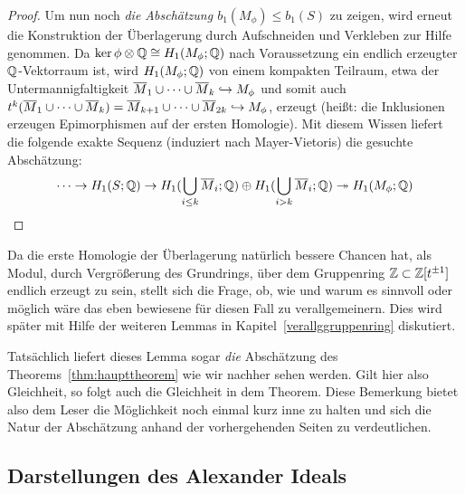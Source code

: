 \begin{proof}
	  Um nun noch\emph{ die Abschätzung $b_1(M_\phi) \leq b_1(S)$ }zu zeigen, wird erneut die Konstruktion der Überlagerung durch Aufschneiden und Verkleben zur Hilfe genommen. Da $\ker\phi \otimes \mathbb{Q} \cong H_1(M_\phi;\mathbb{Q})$ nach Voraussetzung ein endlich erzeugter $\mathbb{Q}$-Vektorraum ist, wird $H_1(M_\phi;\mathbb{Q})$ von einem kompakten Teilraum, etwa der Untermannigfaltigkeit $\overline M_1 \cup \cdots \cup \overline M_k \hookrightarrow M_\phi$ und somit auch $t^k(\overline M_1 \cup \cdots \cup \overline M_k )  = \overline M_{k+1} \cup \cdots \cup \overline M_{2k}\hookrightarrow M_\phi$, erzeugt (heißt: die Inklusionen erzeugen Epimorphismen auf der ersten Homologie). Mit diesem Wissen liefert die folgende exakte Sequenz (induziert nach Mayer-Vietoris) die gesuchte Abschätzung:
	  \[
	  	\cdots \to H_1(S;\mathbb{Q}) \to H_1(\bigcup_{i\leq k}\overline M_i;\mathbb{Q}) \oplus H_1(\bigcup_{i>k} \overline M_i;\mathbb{Q}) \twoheadrightarrow H_1(M_\phi;\mathbb{Q})
	  \]
\end{proof}

\begin{bem}
Da die erste Homologie der Überlagerung natürlich bessere Chancen hat, als Modul, durch Vergrößerung des Grundrings, über dem Gruppenring $\mathbb{Z}\subset \mathbb{Z}[t^{\pm 1}]$ endlich erzeugt zu sein, stellt sich die Frage, ob, wie und warum es sinnvoll oder möglich wäre das eben bewiesene für diesen Fall zu verallgemeinern. Dies wird später mit Hilfe der weiteren Lemmas in Kapitel~\ref{verallggruppenring} diskutiert. 
\end{bem}
\begin{bem}
	Tatsächlich liefert dieses Lemma sogar \emph{die} Abschätzung des Theorems~\ref{thm:haupttheorem} wie wir nachher sehen werden. Gilt hier also Gleichheit, so folgt auch die Gleichheit in dem Theorem. Diese Bemerkung bietet also dem Leser die Möglichkeit noch einmal kurz inne zu halten und sich die Natur der Abschätzung anhand der vorhergehenden Seiten zu verdeutlichen.
\end{bem}

\subsection{Darstellungen des Alexander Ideals}
    
